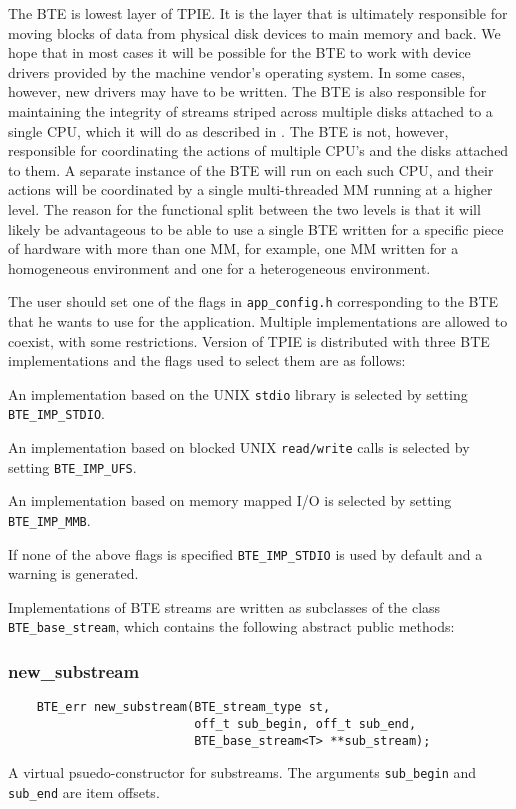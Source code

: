 The BTE is lowest layer of TPIE.  It is the layer that is ultimately
responsible for moving blocks of data from physical disk devices to main
memory and back.  We hope that in most cases it will be possible for the
BTE to work with device drivers provided by the machine vendor's operating
system.  In some cases, however, new drivers may have to be written.  The
BTE is also responsible for maintaining the integrity of streams striped
across multiple disks attached to a single CPU, which it will do as
described in \cite{vitter:parmem1}.  The BTE is not, however, responsible
for coordinating the actions of multiple CPU's and the disks attached to
them.  A separate instance of the BTE will run on each such CPU, and their
actions will be coordinated by a single multi-threaded MM running at a
higher level.  The reason for the functional split between the two levels
is that it will likely be advantageous to be able to use a single BTE
written for a specific piece of hardware with more than one MM, for
example, one MM written for a homogeneous environment and one for a
heterogeneous environment.

The user should set one of the flags in \verb|app_config.h| corresponding
to the BTE that he wants to use for the application.  Multiple
implementations are allowed to coexist, with some restrictions. Version
\version of TPIE is distributed with three BTE implementations and the
flags used to select them are as follows:

An implementation based on the UNIX {\tt stdio} library  is selected by setting {\tt
  BTE\_IMP\_STDIO}.  
 
An implementation based on blocked UNIX {\tt read/write} calls  is selected by setting {\tt BTE\_IMP\_UFS}.

An implementation based on memory mapped I/O is
selected by setting {\tt BTE\_IMP\_MMB}.  

If none of the above flags is specified {\tt BTE\_IMP\_STDIO} is used by
default and a warning is generated.

Implementations of BTE streams are written as subclasses of the class
\verb|BTE_base_stream|, which contains the following abstract public methods:


\subsubsection{new\_substream}
\begin{verbatim}
    BTE_err new_substream(BTE_stream_type st,
                          off_t sub_begin, off_t sub_end,
                          BTE_base_stream<T> **sub_stream);
\end{verbatim}
A virtual psuedo-constructor for substreams. The arguments \verb|sub_begin| and
\verb|sub_end| are item offsets.


